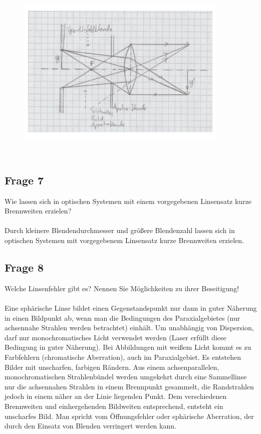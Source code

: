 \documentclass[a4paper,10pt]{scrartcl}
\begin{document}
			\\
	\begin{figure}[h]
\centering
\includegraphics[width=0.9\textwidth]{./Bilder/og14}
\end{figure}
\FloatBarrier			\\
			
		\subsection{Frage 7}
			Wie lassen sich in optischen Systemen mit einem vorgegebenen Linsensatz kurze Brennweiten
			erzielen?\\
			\\
			Durch kleinere Blendendurchmesser und größere Blendenzahl lassen sich in optischen Systemen mit vorgegebenem Linsensatz kurze Brennweiten erzielen.
			
			\subsection{Frage 8}
		Welche Linsenfehler gibt es? Nennen Sie Möglichkeiten zu ihrer Beseitigung!
		\\
		\\
		Eine sphärische Linse bildet einen Gegenstandspunkt nur dann in guter Näherung in einen Bildpunkt ab, wenn man die Bedingungen des Paraxialgebietes (nur achsennahe Strahlen werden betrachtet) einhält. Um unabhängig von Dispersion, darf nur monochromatisches Licht verwendet werden (Laser erfüllt diese Bedingung in guter Näherung). Bei Abbildungen mit weißem Licht kommt es zu Farbfehlern (chromatische Aberration), auch im Paraxialgebiet. Es entstehen Bilder mit unscharfen, farbigen Rändern. Aus einem achsenparallelen, monochromatischen Strahlenbündel werden umgekehrt durch eine Sammellinse nur die achsennahen Strahlen in einem Brennpunkt gesammelt, die Randstrahlen jedoch in einem näher an der Linie liegenden Punkt. Dem verschiedenen Brennweiten und einhergehenden Bildweiten entsprechend, entsteht ein unscharfes Bild. Man spricht vom Öffnungsfehler oder sphärische Aberration, der durch den Einsatz von Blenden verringert werden kann.
	
\end{document}
